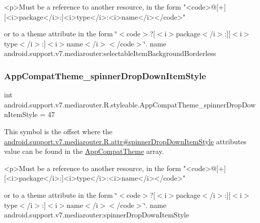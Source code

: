 \begin{DoxyVerb}      <p>Must be a reference to another resource, in the form "<code>@[+][<i>package</i>:]<i>type</i>:<i>name</i></code>"
\end{DoxyVerb}
 or to a theme attribute in the form \char`\"{}$<$code$>$?\mbox{[}$<$i$>$package$<$/i$>$\+:\mbox{]}\mbox{[}$<$i$>$type$<$/i$>$\+:\mbox{]}$<$i$>$name$<$/i$>$$<$/code$>$\char`\"{}.  name android.\+support.\+v7.\+mediarouter\+:selectable\+Item\+Background\+Borderless \mbox{\label{classandroid_1_1support_1_1v7_1_1mediarouter_1_1R_1_1styleable_a7d8b19a24b9742bcfc7efca0b97d4088}} 
\subsubsection{\texorpdfstring{App\+Compat\+Theme\+\_\+spinner\+Drop\+Down\+Item\+Style}{AppCompatTheme\_spinnerDropDownItemStyle}}
{\footnotesize\ttfamily int android.\+support.\+v7.\+mediarouter.\+R.\+styleable.\+App\+Compat\+Theme\+\_\+spinner\+Drop\+Down\+Item\+Style = 47\hspace{0.3cm}{\ttfamily [static]}}

This symbol is the offset where the \hyperlink{classandroid_1_1support_1_1v7_1_1mediarouter_1_1R_1_1attr_a9d74d670aa6baf3da1cbd7cf6b112023}{android.\+support.\+v7.\+mediarouter.\+R.\+attr\#spinner\+Drop\+Down\+Item\+Style} attribute\textquotesingle{}s value can be found in the \hyperlink{classandroid_1_1support_1_1v7_1_1mediarouter_1_1R_1_1styleable_a4e3d3900c75d49aeb2f283cac00214d6}{App\+Compat\+Theme} array.

\begin{DoxyVerb}      <p>Must be a reference to another resource, in the form "<code>@[+][<i>package</i>:]<i>type</i>:<i>name</i></code>"
\end{DoxyVerb}
 or to a theme attribute in the form \char`\"{}$<$code$>$?\mbox{[}$<$i$>$package$<$/i$>$\+:\mbox{]}\mbox{[}$<$i$>$type$<$/i$>$\+:\mbox{]}$<$i$>$name$<$/i$>$$<$/code$>$\char`\"{}.  name android.\+support.\+v7.\+mediarouter\+:spinner\+Drop\+Down\+Item\+Style \mbox{\label{classandroid_1_1support_1_1v7_1_1mediarouter_1_1R_1_1styleable_ad25bcd6aab6c43bde798b7d59a6ad960}} 
